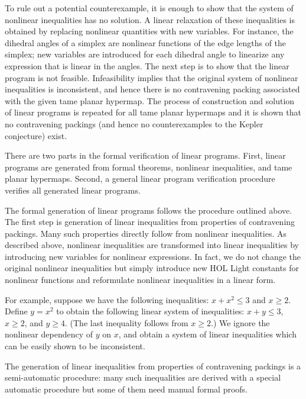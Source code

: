 To rule out a potential counterexample, it is enough to show that the
system of nonlinear inequalities has no solution.  A linear relaxation
of these inequalities is obtained by replacing nonlinear quantities
with new variables. For instance, the dihedral angles of a simplex are
nonlinear functions of the edge lengths of the simplex; new variables
are introduced for each dihedral angle to linearize any expression that
is linear in the angles.  The next step is to show that
the linear program is not feasible. Infeasibility implies that the original
system of nonlinear inequalities is inconsistent, and hence there is
no contravening packing associated with the given tame planar
hypermap. The process of construction and solution of linear programs
is repeated for all tame planar hypermaps and it is shown that no
contravening packings (and hence no counterexamples to the Kepler
conjecture) exist.

There are two parts in the formal verification of linear
programs. First, linear programs are generated from formal theorems,
nonlinear inequalities, and tame planar hypermaps. Second, a general linear
program verification procedure verifies all generated linear programs.

The formal generation of linear programs follows the procedure
outlined above. The first step is generation of linear inequalities
from properties of contravening packings. Many such properties
directly follow from nonlinear inequalities. As described above,
nonlinear inequalities are transformed into linear inequalities by
introducing new variables for nonlinear expressions. In fact, we do
not change the original nonlinear inequalities but simply introduce
new HOL Light constants for nonlinear functions and reformulate
nonlinear inequalities in a linear form.

For example, suppose we have the following inequalities: $x + x^2 \le
3$ and $x \ge 2$. Define $y = x^2$ to obtain the following linear
system of inequalities: $x + y \le 3$, $x \ge 2$, and $y \ge 4$.  (The
last inequality follows from $x \ge 2$.)  We ignore the nonlinear
dependency of $y$ on $x$, and obtain a system of linear inequalities
which can be easily shown to be inconsistent.

The generation of linear inequalities from properties of contravening
packings is a semi-automatic procedure: many such inequalities are
derived with a special automatic procedure but some of them need
manual formal proofs.

